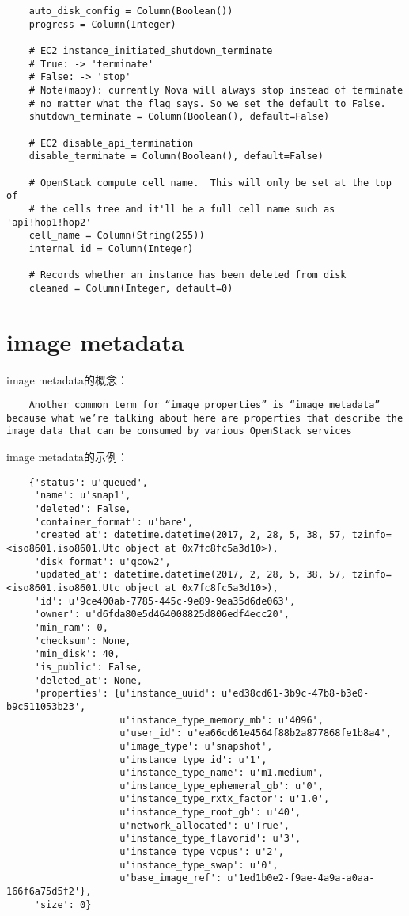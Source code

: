 \documentclass[a4paper,left=1.5cm,right=1.5cm,11pt]{article}
\begin{document}
\begin{lstlisting}
    auto_disk_config = Column(Boolean())
    progress = Column(Integer)

    # EC2 instance_initiated_shutdown_terminate
    # True: -> 'terminate'
    # False: -> 'stop'
    # Note(maoy): currently Nova will always stop instead of terminate
    # no matter what the flag says. So we set the default to False.
    shutdown_terminate = Column(Boolean(), default=False)

    # EC2 disable_api_termination
    disable_terminate = Column(Boolean(), default=False)

    # OpenStack compute cell name.  This will only be set at the top of
    # the cells tree and it'll be a full cell name such as 'api!hop1!hop2'
    cell_name = Column(String(255))
    internal_id = Column(Integer)

    # Records whether an instance has been deleted from disk
    cleaned = Column(Integer, default=0)
    \end{lstlisting}

\section{image metadata}
    image metadata的概念：
    \begin{lstlisting}
    Another common term for “image properties” is “image metadata” because what we’re talking about here are properties that describe the image data that can be consumed by various OpenStack services 
    \end{lstlisting}

    image metadata的示例：
    \begin{lstlisting}
    {'status': u'queued', 
     'name': u'snap1', 
     'deleted': False, 
     'container_format': u'bare', 
     'created_at': datetime.datetime(2017, 2, 28, 5, 38, 57, tzinfo=<iso8601.iso8601.Utc object at 0x7fc8fc5a3d10>), 
     'disk_format': u'qcow2', 
     'updated_at': datetime.datetime(2017, 2, 28, 5, 38, 57, tzinfo=<iso8601.iso8601.Utc object at 0x7fc8fc5a3d10>), 
     'id': u'9ce400ab-7785-445c-9e89-9ea35d6de063', 
     'owner': u'd6fda80e5d464008825d806edf4ecc20', 
     'min_ram': 0, 
     'checksum': None, 
     'min_disk': 40, 
     'is_public': False, 
     'deleted_at': None, 
     'properties': {u'instance_uuid': u'ed38cd61-3b9c-47b8-b3e0-b9c511053b23', 
                    u'instance_type_memory_mb': u'4096', 
                    u'user_id': u'ea66cd61e4564f88b2a877868fe1b8a4', 
                    u'image_type': u'snapshot', 
                    u'instance_type_id': u'1', 
                    u'instance_type_name': u'm1.medium', 
                    u'instance_type_ephemeral_gb': u'0', 
                    u'instance_type_rxtx_factor': u'1.0', 
                    u'instance_type_root_gb': u'40', 
                    u'network_allocated': u'True', 
                    u'instance_type_flavorid': u'3', 
                    u'instance_type_vcpus': u'2', 
                    u'instance_type_swap': u'0', 
                    u'base_image_ref': u'1ed1b0e2-f9ae-4a9a-a0aa-166f6a75d5f2'}, 
     'size': 0}
    \end{lstlisting}
\end{document}
